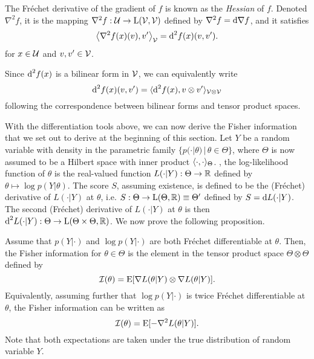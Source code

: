 \begin{definition}[Hessian]
  The Fréchet derivative of the gradient of $f$ is known as the \emph{Hessian} of $f$.
  Denoted $\nabla^2 f$, it is the mapping $\nabla^2 f: {\mathcal U} \to \text{L}({\mathcal V},{\mathcal V})$ defined by $\nabla^2 f  = \text{d} \nabla f$, and it satisfies
  \[
    \left\langle \nabla^2 f(x)(v) , v' \right\rangle_{\mathcal V} = \text{d}^2 f(x)(v,v').
  \]
  for $x\in{\mathcal U}$ and $v,v'\in{\mathcal V}$.
\end{definition}

\begin{remark}
  Since $\text{d}^2 f(x)$ is a bilinear form in ${\mathcal V}$, we can equivalently write
  \[
    \text{d}^2 f(x)(v,v') = \langle\text{d}^2 f(x), v \otimes v'\rangle_{{\mathcal V}\otimes{\mathcal V}}
  \]
  following the correspondence between bilinear forms and tensor product spaces.  
\end{remark}

With the differentiation tools above, we can now derive the Fisher information that we set out to derive at the beginning of this section.
Let $Y$ be a random variable with density in the parametric family $\{p(\cdot|\theta) \,|\, \theta \in \Theta \}$, where $\Theta$ is now assumed to be a Hilbert space with inner product $\langle\cdot,\cdot\rangle_\Theta$.
, the log-likelihood function of $\theta$ is the real-valued function $L(\cdot|Y):\Theta\to\mathbb{R}$ defined by $\theta \mapsto \log p(Y|\theta)$. 
The score $S$, assuming existence, is defined to be the (Fréchet) derivative of $L(\cdot|Y)$ at $\theta$, i.e. $S:\Theta \to \text{L}(\Theta,\mathbb{R}) \equiv \Theta'$ defined by $S = \text{d} L(\cdot | Y)$.
The second (Fréchet) derivative of $L(\cdot|Y)$ at $\theta$ is then $\text{d}^2 L(\cdot|Y): \Theta \to \text{L}(\Theta \times \Theta,\mathbb{R})$.
We now prove the following proposition.

\begin{proposition}\label{thm:fisherinfohilbert}
  Assume that $p(Y|\cdot)$ and $\log p(Y|\cdot)$ are both Fréchet differentiable at $\theta$.
  Then, the Fisher information for $\theta\in\Theta$ is the element in the tensor product space $\Theta \otimes \Theta$ defined by
  \[
    {\mathcal I}(\theta) = \operatorname{E} [\nabla L(\theta|Y) \otimes \nabla L(\theta|Y)].
  \]  
  Equivalently, assuming further that $\log p(Y|\cdot)$ is twice Fréchet differentiable at $\theta$, the Fisher information can be written as
  \[
    {\mathcal I}(\theta) = \operatorname{E}[-\nabla^2 L(\theta|Y)].
  \]
  Note that both expectations are taken under the true distribution of random variable $Y$.
\end{proposition}

